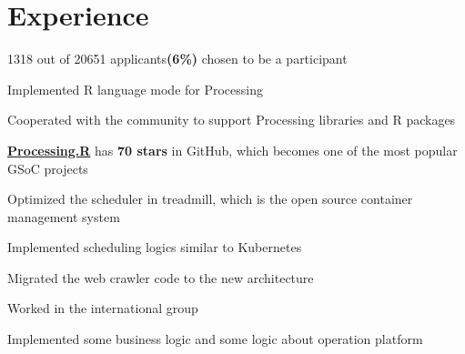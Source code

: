 \documentclass[]{deedy-resume-openfont}
\begin{document}
\begin{minipage}[t]{0.73\textwidth} 


\section{Experience}
\sectionsep
{}
\vspace{\topsep}
\begin{tightemize}
    \item 1318 out of 20651 applicants\textbf{(6\%)} chosen to be a participant
    \item Implemented R language mode for Processing
    \item Cooperated with the community to support Processing libraries and R packages
    \item \href{https://github.com/gaocegege/Processing.R}{\bf Processing.R} has \textbf{70 stars} in GitHub, which becomes one of the most popular GSoC projects
\end{tightemize}
\sectionsep

\begin{tightemize}
\item Optimized the scheduler in treadmill, which is the open source container management system
\item Implemented scheduling logics similar to Kubernetes
\end{tightemize}
\sectionsep

\begin{tightemize}
\item Migrated the web crawler code to the new architecture
\end{tightemize}
\sectionsep

\begin{tightemize}
\item Worked in the international group
\item Implemented some business logic and some logic about operation platform
\end{tightemize}
\sectionsep


\end{minipage}
\end{document}

